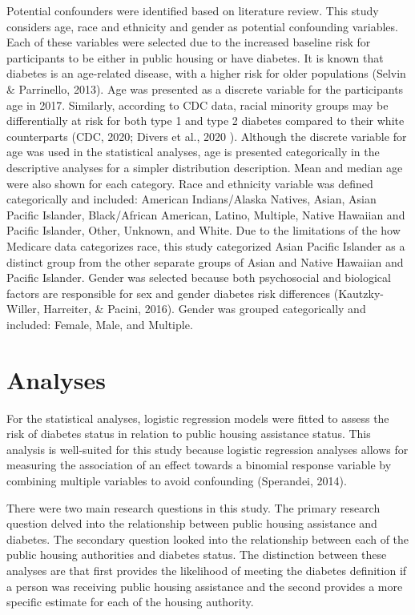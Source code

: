 \documentclass [11pt, proquest] {uwthesis}[2015/03/03]
\begin{document}
Potential confounders were identified based on literature review. This
study considers age, race and ethnicity and gender as potential
confounding variables. Each of these variables were selected due to the
increased baseline risk for participants to be either in public housing
or have diabetes. It is known that diabetes is an age-related disease,
with a higher risk for older populations (Selvin \& Parrinello, 2013).
Age was presented as a discrete variable for the participants age in
2017. Similarly, according to CDC data, racial minority groups may be
differentially at risk for both type 1 and type 2 diabetes compared to
their white counterparts (CDC, 2020; Divers et al., 2020 ). Although the
discrete variable for age was used in the statistical analyses, age is
presented categorically in the descriptive analyses for a simpler
distribution description. Mean and median age were also shown for each
category. Race and ethnicity variable was defined categorically and
included: American Indians/Alaska Natives, Asian, Asian Pacific
Islander, Black/African American, Latino, Multiple, Native Hawaiian and
Pacific Islander, Other, Unknown, and White. Due to the limitations of
the how Medicare data categorizes race, this study categorized Asian
Pacific Islander as a distinct group from the other separate groups of
Asian and Native Hawaiian and Pacific Islander. Gender was selected
because both psychosocial and biological factors are responsible for sex
and gender diabetes risk differences (Kautzky-Willer, Harreiter, \&
Pacini, 2016). Gender was grouped categorically and included: Female,
Male, and Multiple.

\section{Analyses}\label{analyses}

For the statistical analyses, logistic regression models were fitted to
assess the risk of diabetes status in relation to public housing
assistance status. This analysis is well-suited for this study because
logistic regression analyses allows for measuring the association of an
effect towards a binomial response variable by combining multiple
variables to avoid confounding (Sperandei, 2014).

There were two main research questions in this study. The primary
research question delved into the relationship between public housing
assistance and diabetes. The secondary question looked into the
relationship between each of the public housing authorities and diabetes
status. The distinction between these analyses are that first provides
the likelihood of meeting the diabetes definition if a person was
receiving public housing assistance and the second provides a more
specific estimate for each of the housing authority.
\end{document}
